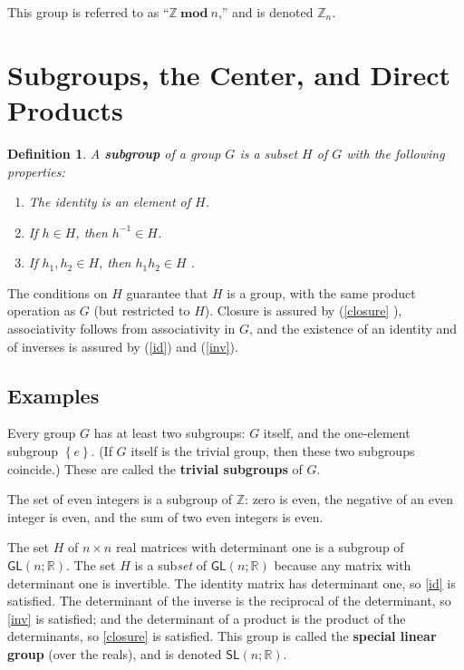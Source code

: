 \documentclass{amsbook}
\theoremstyle{plain}
\newtheorem{definition}[theorem]{Definition}
\numberwithin{equation}{chapter}
\numberwithin{theorem}{chapter}
\begin{document}
This group is referred to as ``$\mathbb{Z}\mathbf{\ mod\ }n$,'' and is denoted
$\mathbb{Z}_{n}$.

\section{Subgroups, the Center, and Direct Products\label{sub}}

\begin{definition}
A \textbf{subgroup} of a group $G$ is a subset $H$ of $G$ with the following properties:

\begin{enumerate}
\item \label{id}The identity is an element of $H$.

\item \label{inv}If $h\in H$, then $h^{-1}\in H$.

\item \label{closure}If $h_{1},h_{2}\in H$, then $h_{1}h_{2}\in H$ .
\end{enumerate}
\end{definition}

The conditions on $H$ guarantee that $H$ is a group, with the same product
operation as $G$ (but restricted to $H$). Closure is assured by (\ref{closure}%
), associativity follows from associativity in $G$, and the existence of an
identity and of inverses is assured by (\ref{id}) and (\ref{inv}).

\subsection{Examples}

Every group $G$ has at least two subgroups: $G$ itself, and the one-element
subgroup $\left\{  e\right\}  $. (If $G$ itself is the trivial group, then
these two subgroups coincide.) These are called the \textbf{trivial subgroups}
of $G$.

The set of even integers is a subgroup of $\mathbb{Z}$: zero is even, the
negative of an even integer is even, and the sum of two even integers is even.

The set $H$ of $n\times n$ real matrices with determinant one is a subgroup of
$\mathsf{GL}(n;\mathbb{R})$. The set $H$ is a sub\textit{set} of
$\mathsf{GL}(n;\mathbb{R})$ because any matrix with determinant one is
invertible. The identity matrix has determinant one, so \ref{id} is satisfied.
The determinant of the inverse is the reciprocal of the determinant, so
\ref{inv} is satisfied; and the determinant of a product is the product of the
determinants, so \ref{closure} is satisfied. This group is called the
\textbf{special linear group} (over the reals), and is denoted $\mathsf{SL}%
(n;\mathbb{R})$.
\end{document}
